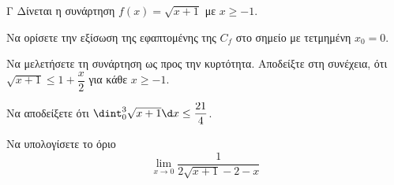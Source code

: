 \begin{thema}{Γ}
Δίνεται η συνάρτηση $f(x) = \sqrt{x+1}$ με $x \ge -1$. 
\begin{erwthma}
  \item Να ορίσετε την εξίσωση της εφαπτομένης της $C_f$ στο σημείο με τετμημένη $x_0=0$.
  \item Να μελετήσετε τη συνάρτηση ως προς την κυρτότητα. Αποδείξτε στη συνέχεια, ότι $\sqrt{x+1} \le 1 + \dfrac{x}{2}$ για κάθε $x \ge -1$.
  \item Να αποδείξετε ότι $\dint_0^3 \sqrt{x+1} \d x \le \dfrac{21}{4}$.
  \item Να υπολογίσετε το όριο
\[\lim\limits_{x\to 0}{\dfrac{1}{2\sqrt{x+1}-2-x}}\]
\end{erwthma}
\end{thema}
